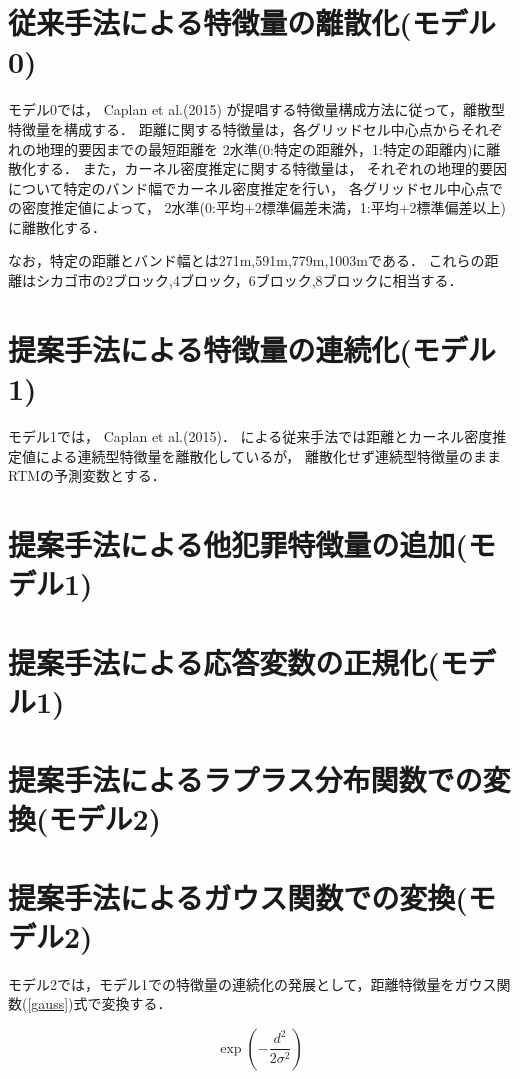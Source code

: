 \documentclass[12pt,a4paper,oneside]{jsbook}
\theoremstyle{plain}
\begin{document}
\section{従来手法による特徴量の離散化(モデル0)}
モデル0では，
Caplan et al.(2015)\cite{caplan2015}
が提唱する特徴量構成方法に従って，離散型特徴量を構成する．
距離に関する特徴量は，各グリッドセル中心点からそれぞれの地理的要因までの最短距離を
2水準(0:特定の距離外，1:特定の距離内)に離散化する．
また，カーネル密度推定に関する特徴量は，
それぞれの地理的要因について特定のバンド幅でカーネル密度推定を行い，
各グリッドセル中心点での密度推定値によって，
2水準(0:平均+2標準偏差未満，1:平均+2標準偏差以上)に離散化する．

なお，特定の距離とバンド幅とは271m,591m,779m,1003mである．
これらの距離はシカゴ市の2ブロック,4ブロック，6ブロック,8ブロックに相当する．
\section{提案手法による特徴量の連続化(モデル1)}
モデル1では，
Caplan et al.(2015)\cite{caplan2015}．
による従来手法では距離とカーネル密度推定値による連続型特徴量を離散化しているが，
離散化せず連続型特徴量のままRTMの予測変数とする．
\section{提案手法による他犯罪特徴量の追加(モデル1)}
\section{提案手法による応答変数の正規化(モデル1)}
\section{提案手法によるラプラス分布関数での変換(モデル2)}
\section{提案手法によるガウス関数での変換(モデル2)}
モデル2では，モデル1での特徴量の連続化の発展として，距離特徴量をガウス関数(\ref{gauss})式で変換する．

\begin{equation}\label{gauss}
  \exp(-\frac{d^2}{2\sigma^2})
\end{equation}
\end{document}
